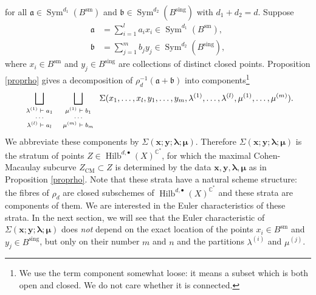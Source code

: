 \documentclass{amsart}
\theoremstyle{definition}
\newcommand{\CC} {\mathbb{C}}          %
\newcommand{\Sym}{\operatorname{Sym}}
\newcommand{\Hilb}{\operatorname{Hilb}}
\newcommand{\CM}{\operatorname{CM}}
\newcommand{\sm}{\operatorname{sm}}
\newcommand{\sing}{\operatorname{sing}}
\begin{document}
for all $\mathfrak{a} \in \Sym^{d_1}(B^{\sm})$ and $\mathfrak{b} \in \Sym^{d_2}(B^{\sing})$ with $d_1+d_2=d$. Suppose 
\begin{align*}
\mathfrak{a} &= \sum_{i=1}^{l} a_i x_i \in \Sym^{d_1}(B^{\sm}), \\
\mathfrak{b} &= \sum_{j=1}^{m} b_j y_j \in \Sym^{d_2}(B^{\sing}),
\end{align*}
where  $x_i \in B^{\sm}$ and $y_j \in B^{\sing}$ are collections of distinct closed points. Proposition \ref{proprho} gives a decomposition of $\rho_{d}^{-1} ( \mathfrak{a} + \mathfrak{b} )$ into components\footnote{We use the term component somewhat loose: it means a subset which is both open and closed. We do not care whether it is connected.}
\begin{equation} \label{comps}
\bigsqcup_{{\scriptsize{\begin{array}{c} \lambda^{(1)} \vdash a_1 \\ \cdots \\ \lambda^{(l)} \vdash a_l \end{array}}}} \bigsqcup_{\scriptsize{\begin{array}{c} \mu^{(1)} \vdash b_1 \\ \cdots \\ \mu^{(m)} \vdash b_m \end{array}}} \Sigma(x_1, \ldots, x_l, y_1, \ldots, y_m, \lambda^{(1)}, \ldots, \lambda^{(l)}, \mu^{(1)}, \ldots, \mu^{(m)}).
\end{equation}
We abbreviate these components by $\Sigma(\boldsymbol{x};\boldsymbol{y};\boldsymbol{\lambda};\boldsymbol{\mu})$. Therefore $\Sigma(\boldsymbol{x};\boldsymbol{y};\boldsymbol{\lambda};\boldsymbol{\mu})$ is the stratum of points $Z \in \Hilb^{d,\bullet}(X)^{\CC^*}$, for which the maximal Cohen-Macaulay subcurve $Z_{\CM} \subset Z$ is determined by the data $\boldsymbol{x}, \boldsymbol{y}, \boldsymbol{\lambda}, \boldsymbol{\mu}$ as in Proposition \ref{proprho}. Note that these strata have a natural scheme structure: the fibres of $\rho_d$ are closed subschemes of $\Hilb^{d,\bullet}(X)^{\CC^*}$ and these strata are components of them. We are interested in the Euler characteristics of these strata. In the next section, we will see that the Euler characteristic of $\Sigma(\boldsymbol{x};\boldsymbol{y};\boldsymbol{\lambda};\boldsymbol{\mu})$ does \emph{not} depend on the exact location of the points $x_i \in B^{\sm}$ and $y_j \in B^{\sing}$, but only on their number $m$ and $n$ and the partitions $\lambda^{(i)}$ and $\mu^{(j)}$.
\end{document}
